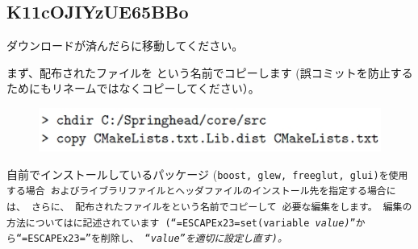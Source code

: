\subsection{K11cOJIYzUE65BBo}
\label{subsec:PrepareLibrary}

\noindent
\KLUDGE ダウンロードが済んだら\KLUDGE に移動してください。

\noindent
\KLUDGE まず、配布されたファイル\KLUDGE を
\CMakeLists{}\KLUDGE という名前でコピーします
(\KLUDGE 誤コミットを防止するためにもリネームではなくコピーしてください）。

\medskip
\ifLwarp
	\begin{figure}[h]
	    \begin{center}
	    \includegraphics[width=\textwidth]{fig/command-2-2-a.eps}
	    \end{center}
	    \label{fig:DownloadTree}
	\end{figure}
\else
\begin{narrow}[15pt]
\end{narrow}
\fi

\medskip
\noindent
\KLUDGE 自前でインストールしているパッケージ
(\tt{boost}, \tt{glew}, \tt{freeglut}, \tt{glui})\KLUDGE を使用する場合
\KLUDGE およびライブラリファイルとヘッダファイルのインストール先を指定する場合には、
\KLUDGE さらに、
\KLUDGE 配布されたファイル\KLUDGE を\CMakeConf{}\KLUDGE という名前でコピーして
\KLUDGE 必要な編集をします。
\KLUDGE 編集の方法については\CMakeConf{}\KLUDGE に記述されています
(``\tt{=ESCAPEx23=set(variable \it{value})}''\KLUDGE から``\tt{=ESCAPEx23=}''\KLUDGE を削除し、
``\it{value}''\KLUDGE を適切に設定し直す)\KLUDGE 。

